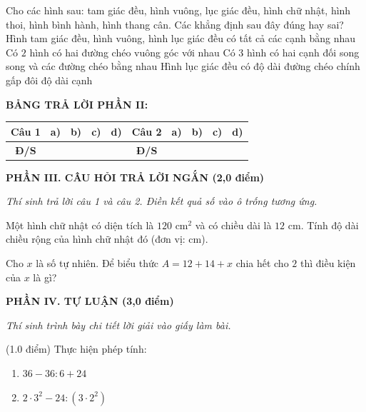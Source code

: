 \documentclass[12pt,a4paper]{article}
\begin{document}
\begin{ex}
Cho các hình sau: tam giác đều, hình vuông, lục giác đều, hình chữ nhật, hình thoi, hình bình hành, hình thang cân. Các khẳng định sau đây đúng hay sai?
\choiceTF
{\True Hình tam giác đều, hình vuông, hình lục giác đều có tất cả các cạnh bằng nhau}
{\True Có $2$ hình có hai đường chéo vuông góc với nhau}
{\True Có $3$ hình có hai cạnh đối song song và các đường chéo bằng nhau}
{\True Hình lục giác đều có độ dài đường chéo chính gấp đôi độ dài cạnh}
\end{ex}


\noindent\textbf{BẢNG TRẢ LỜI PHẦN II:}
\begin{center}
\begin{tabular}{|c|c|c|c|c||c|c|c|c|c|}
\hline
\textbf{Câu 1} & \textbf{a)} & \textbf{b)} & \textbf{c)} & \textbf{d)} & \textbf{Câu 2} & \textbf{a)} & \textbf{b)} & \textbf{c)} & \textbf{d)} \\
\hline
\textbf{Đ/S} & \rule{0pt}{0.6cm} & & & & \textbf{Đ/S} & & & & \\
\hline
\end{tabular}
\end{center}
\vspace{2mm}

\setcounter{ex}{0}
\noindent\textbf{\large PHẦN III. CÂU HỎI TRẢ LỜI NGẮN (2,0 điểm)}

\textit{Thí sinh trả lời câu 1 và câu 2. Điền kết quả số vào ô trống tương ứng.}

\vspace{1mm}
\begin{ex}
Một hình chữ nhật có diện tích là $120\text{ cm}^2$ và có chiều dài là $12\text{ cm}$. Tính độ dài chiều rộng của hình chữ nhật đó (đơn vị: cm). 
\end{ex}

\begin{ex}
Cho $x$ là số tự nhiên. Để biểu thức $A = 12 + 14 + x$ chia hết cho $2$ thì điều kiện của $x$ là gì? 
\end{ex}


\setcounter{ex}{0}
\noindent\textbf{\large PHẦN IV. TỰ LUẬN (3,0 điểm)}

\textit{Thí sinh trình bày chi tiết lời giải vào giấy làm bài.}

\vspace{1mm}
\begin{ex} (1.0 điểm)
Thực hiện phép tính:
\begin{enumerate}[label=\textbf{\alph*)}, leftmargin=0.8cm, itemsep=2pt]
\item $36 - 36 : 6 + 24$
\item $2 \cdot 3^2 - 24 : (3 \cdot 2^2)$
\end{enumerate}
\end{ex}
\vspace{1.5mm}
\end{document}
